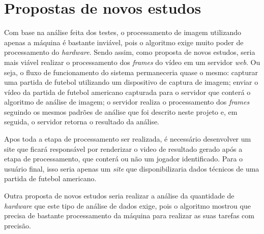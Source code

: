 \section{\textbf{Propostas de novos estudos}}

Com base na análise feita dos testes, o processamento de imagem utilizando apenas a máquina é bastante inviável, pois o algoritmo exige muito poder de processamento do \textit{hardware}. Sendo assim, como proposta de novos estudos, seria mais viável realizar o processamento dos \textit{frames} do vídeo em um servidor \textit{web}. Ou seja,  o fluxo de funcionamento do sistema permaneceria quase o mesmo: capturar uma partida de futebol utilizando um dispositivo de captura de imagem; enviar o vídeo da partida de futebol americano capturada para o servidor que conterá o algoritmo de análise de imagem; o servidor realiza o processamento dos \textit{frames} seguindo os mesmos padrões de análise que foi descrito neste projeto e, em seguida, o servidor retorna o resultado da análise.

Apos toda a etapa de processamento ser realizada, é necessário desenvolver um site que ficará responsável por renderizar o video de resultado gerado após a etapa de processamento, que conterá ou não um jogador identificado. Para o usuário final, isso seria apenas um \textit{site} que disponibilizaria dados técnicos de uma partida de futebol americano.

Outra proposta de novos estudos seria realizar a análise da quantidade de \textit{hardware} que este tipo de análise de dados exige, pois o algoritmo mostrou que precisa de bastante processamento da máquina para realizar as suas tarefas com precisão.